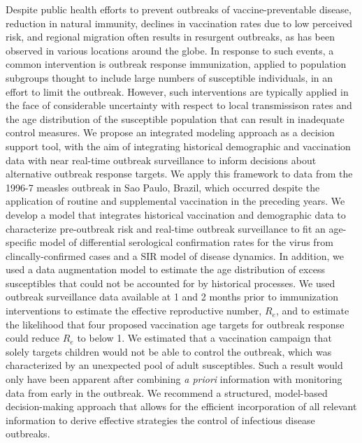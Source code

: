 Despite public health efforts to prevent outbreaks of vaccine-preventable disease, reduction in natural immunity, declines in vaccination rates due to low perceived risk, and regional migration often results in resurgent outbreaks, as has been observed in various locations around the globe. In response to such events, a common intervention is outbreak response immunization, applied to population subgroups thought to include large numbers of susceptible individuals, in an effort to limit the outbreak. However, such interventions are typically applied in the face of considerable uncertainty with respect to local transmissison rates and the age distribution of the susceptible population that can result in inadequate control measures. We propose an integrated modeling approach as a decision support tool, with the aim of integrating historical demographic and vaccination data with near real-time outbreak surveillance to inform decisions about alternative outbreak response targets. We apply this framework to data from the 1996-7 measles outbreak in Sao Paulo, Brazil, which occurred despite the application of routine and supplemental vaccination in the preceding years. We develop a model that integrates historical vaccination and demographic data to characterize pre-outbreak risk and real-time outbreak surveillance to fit an age-specific model of differential serological confirmation rates for the virus from clincally-confirmed cases and a SIR model of disease dynamics.  In addition, we used a data augmentation model to estimate the age distribution of excess susceptibles that could not be accounted for by historical processes. We used outbreak surveillance data available at 1 and 2 months prior to immunization interventions to estimate the effective reproductive number, \(R_e\), and to estimate the likelihood that four proposed vaccination age targets for outbreak response could reduce \(R_e\) to below 1.  We estimated that a vaccination campaign that solely targets children would not be able to control the outbreak, which was characterized by an unexpected pool of adult susceptibles. Such a result would only have been apparent after combining \textit{a priori} information with monitoring data from early in the outbreak. We recommend a structured, model-based decision-making approach that allows for the efficient incorporation of all relevant information to derive effective strategies the control of infectious disease outbreaks.